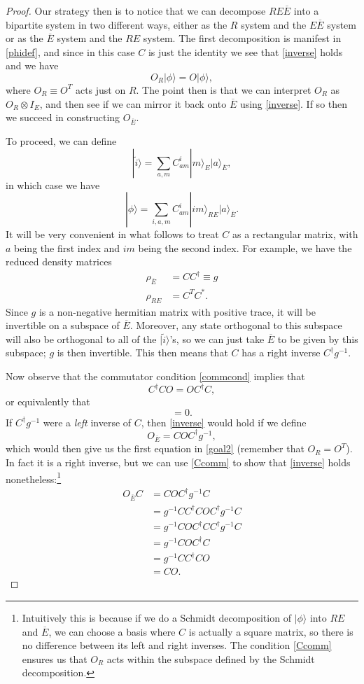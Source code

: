 \documentclass[11pt]{article}
\newcommand{\be}{\begin{equation}}
\newcommand{\ee}{\end{equation}}
\newcommand{\ran}{\rangle}
\newcommand{\wt}{\widetilde}
\newcommand{\ol}{\overline}
\begin{document}
\begin{proof}
Our strategy then is to notice that we can decompose $RE\ol{E}$ into a bipartite system in two different ways, either as the $R$ system and the $ E \ol{E}$ system or as the $\ol{E}$ system and the $RE$ system.  The first decomposition is manifest in \eqref{phidef}, and since in this case $C$ is just the identity we see that \eqref{inverse} holds and we have
\be
O_R|\phi\ran=O|\phi\ran,
\ee
where $O_R\equiv O^T$ acts just on $R$.  The point then is that we can interpret $O_R$ as $O_R\otimes I_E$, and then see if we can mirror it back onto $\ol{E}$ using \eqref{inverse}.  If so then we succeed in constructing $O_{\ol{E}}$.

To proceed, we can define
\be
|\wt{i}\ran=\sum_{a,m}C^{i}_{am}|m\ran_E |a\ran_{\ol{E}},  
\ee
in which case we have
\be
|\phi\ran=\sum_{i,a,m}C^i_{am}|im\ran_{RE}|a\ran_{\ol{E}}.  
\ee
It will be very convenient in what follows to treat $C$ as a rectangular matrix, with $a$ being the first index and $im$ being the second index.  For example, we have the reduced density matrices
\begin{align}\nonumber
\rho_{\ol{E}}&=CC^\dagger\equiv g\\
\rho_{RE}&=C^T C^*.
\end{align}
Since $g$ is a non-negative hermitian matrix with positive trace, it will be invertible on a subspace of $\ol{E}$.  Moreover, any state orthogonal to this subspace will also be orthogonal to all of the $|\wt{i}\ran$'s, so we can just take $\ol{E}$ to be given by this subspace; $g$ is then invertible.  This then means that $C$ has a right inverse $ C^\dagger g^{-1}$.

Now observe that the commutator condition \eqref{commcond} implies that
\be\label{Ccomm}
C^\dagger C O=O C^\dagger C,
\ee
or equivalently that
\be
[O_R\otimes I_E,\rho_{RE}]=0.
\ee
If $C^\dagger g^{-1}$ were a \textit{left} inverse of $C$, then \eqref{inverse} would hold if we define
\be
O_{\ol{E}}=CO C^\dagger g^{-1},
\ee
which would then give us the first equation in \eqref{goal2} (remember that $O_R=O^T$).  In fact it is a right inverse, but we can use \eqref{Ccomm} to show that \eqref{inverse} holds nonetheless:\footnote{Intuitively this is because if we do a Schmidt decomposition of $|\phi\ran$ into $RE$ and $\ol{E}$, we can choose a basis where $C$ is actually a square matrix, so there is no difference between its left and right inverses.  The condition \eqref{Ccomm} ensures us that $O_R$ acts within the subspace defined by the Schmidt decomposition.}
\begin{align}\nonumber
O_{\ol{E}}C&=CO C^\dagger g^{-1} C\\\nonumber
&=g^{-1}CC^\dagger CO C^\dagger g^{-1} C\\\nonumber
&=g^{-1}COC^\dagger C C^\dagger g^{-1} C\\\nonumber
&=g^{-1}COC^\dagger C\\\nonumber
&=g^{-1}CC^\dagger C O\\
&=CO.
\end{align}


\end{proof}
\end{document}
